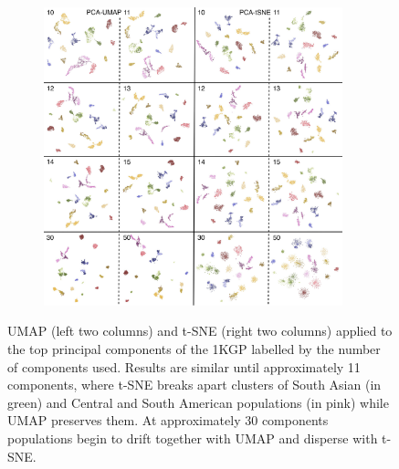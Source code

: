 \documentclass[12pt]{pnas-new}
\begin{document}
\begin{figure}
    \centering
    \begin{subfigure}{0.95\textwidth}
    \includegraphics[width=0.95\textwidth]{images/megamontage_PC10_50.pdf}
    \end{subfigure}
    \caption{UMAP (left two columns) and t-SNE (right two columns) applied to the top principal components of the 1KGP labelled by the number of components used. Results are similar until approximately 11 components, where t-SNE breaks apart clusters of South Asian (in green) and Central and South American populations (in pink) while UMAP preserves them. At approximately 30 components populations begin to drift together with UMAP and disperse with t-SNE.}
    \label{fig:supp_megamontage_pc10_50}
\end{figure}
\end{document}
